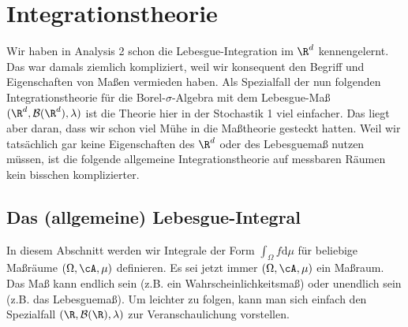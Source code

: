 \chapter{Integrationstheorie}
Wir haben in Analysis 2 schon die Lebesgue-Integration im $\R^d$ kennengelernt. Das war damals ziemlich kompliziert, weil wir konsequent den Begriff und Eigenschaften von Ma\ss en vermieden haben. Als Spezialfall der nun folgenden Integrationstheorie f\"ur die Borel-$\sigma$-Algebra mit dem Lebesgue-Ma\ss{} $(\R^d, \mathcal B(\R^d), \lambda)$ ist die Theorie hier in der Stochastik 1 viel einfacher. Das liegt aber daran, dass wir schon viel M\"uhe in die Ma\ss theorie gesteckt hatten. Weil wir tats\"achlich gar keine Eigenschaften des $\R^d$ oder des Lebesguema\ss{} nutzen m\"ussen, ist die folgende allgemeine Integrationstheorie auf messbaren R\"aumen kein bisschen komplizierter.

\section{Das (allgemeine) Lebesgue-Integral}

In diesem Abschnitt werden wir Integrale der Form $ \int_{\Omega} f \mathrm{d}\mu$ für beliebige Ma\ss r\"aume $(\Omega, \cA, \mu)$ definieren. Es sei jetzt immer $(\Omega, \cA, \mu)$ ein Maßraum. Das Ma\ss{} kann endlich sein (z.B. ein Wahrscheinlichkeitsma\ss) oder unendlich sein (z.B. das Lebesguema\ss). Um leichter zu folgen, kann man sich einfach den Spezialfall $(\R, \mathcal B(\R), \lambda)$ zur Veranschaulichung vorstellen.

